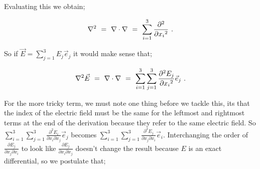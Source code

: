 \documentclass{article}
\begin{document}
Evaluating this we obtain;

\begin{equation} \label{eb-eq-51-44}
\nabla^{2} \hspace{0.125cm} = \hspace{0.125cm} \nabla\cdot\nabla \hspace{0.125cm} = \hspace{0.125cm} \sum_{i=1}^{3} \frac{\partial^{2}}{\partial{x_i}^{2}} \hspace{0.125cm} .
\end{equation}

So if \begin{math} \vec{E} = \sum_{j=1}^{3} E_j \vec{e}_j \end{math} it would make sense that;

\begin{equation} \label{eb-eq-51-45}
\nabla^{2}\vec{E} \hspace{0.125cm} = \hspace{0.125cm} \nabla\cdot\nabla \hspace{0.125cm} = \hspace{0.125cm} \sum_{i=1}^{3} \sum_{j=1}^{3} \frac{\partial^{2} E_j}{\partial{x_i}^{2}} \vec{e}_j \hspace{0.125cm} .
\end{equation}

For the more tricky term, we must note one thing before we tackle this, its that the index of the electric field must be the same for the leftmost and rightmost terms at the end of the derivation because they refer to the same electric field. So \begin{math} \sum_{i=1}^{3} \sum_{j=1}^{3} \frac{\partial^{2}{E_i}}{\partial{x_i}\partial{x_j}} \vec{e}_j \end{math} becomes \begin{math} \sum_{i=1}^{3} \sum_{j=1}^{3} \frac{\partial^{2}{E_j}}{\partial{x_j}\partial{x_i}} \vec{e}_i \end{math}. Interchanging the order of \begin{math} \frac{\partial{E_j}}{\partial{x_j}\partial{x_i}} \end{math} to look like \begin{math} \frac{\partial{E_j}}{\partial{x_i}\partial{x_j}} \end{math} doesn't change the result because \begin{math} E \end{math} is an exact differential, so we postulate that;
\end{document}
